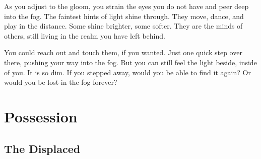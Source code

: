 As you adjust to the gloom, you strain the eyes you do not have and peer deep into the fog.
The faintest hints of light shine through.
They move, dance, and play in the distance.
Some shine brighter, some softer.
They are the minds of others, still living in the realm you have left behind.

You could reach out and touch them, if you wanted.
Just one quick step over there, pushing your way into the fog.
But you can still feel the light beside, inside of you.
It is so dim.
If you stepped away, would you be able to find it again?
Or would you be lost in the fog forever?

\section{Possession}

\subsection{The Displaced}
